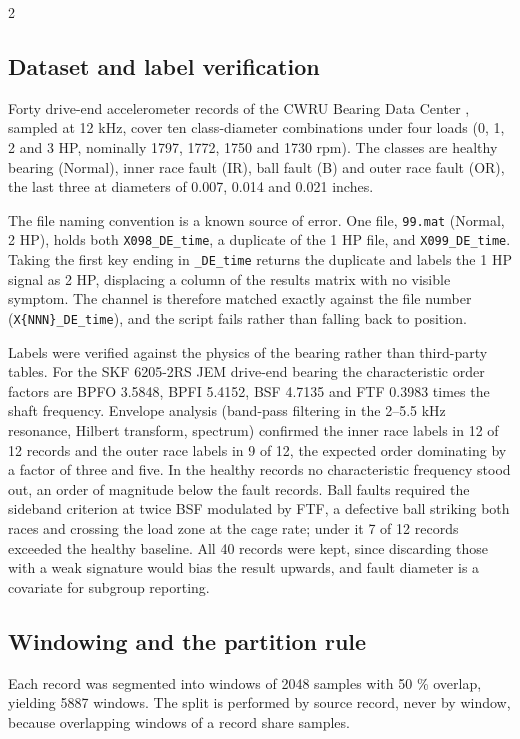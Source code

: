 \documentclass[12pt,twoside,titlepage]{ingenius}
\begin{document}
\begin{multicols}{2}
\subsection{Dataset and label verification}

Forty drive-end accelerometer records of the CWRU Bearing Data Center
\cite{cwru}, sampled at 12 kHz, cover ten class-diameter combinations under four
loads (0, 1, 2 and 3 HP, nominally 1797, 1772, 1750 and 1730 rpm). The classes
are healthy bearing (Normal), inner race fault (IR), ball fault (B) and outer
race fault (OR), the last three at diameters of 0.007, 0.014 and 0.021 inches.

The file naming convention is a known source of error. One file,
\texttt{99.mat} (Normal, 2 HP), holds both \texttt{X098\_DE\_time}, a duplicate of
the 1 HP file, and \texttt{X099\_DE\_time}. Taking the first key ending in
\texttt{\_DE\_time} returns the duplicate and labels the 1 HP signal as 2 HP,
displacing a column of the results matrix with no visible symptom. The channel
is therefore matched exactly against the file number
(\texttt{X\{NNN\}\_DE\_time}), and the script fails rather than falling back to
position.

Labels were verified against the physics of the bearing rather than third-party
tables. For the SKF 6205-2RS JEM drive-end bearing the characteristic order
factors are BPFO 3.5848, BPFI 5.4152, BSF 4.7135 and FTF 0.3983 times the shaft
frequency. Envelope analysis (band-pass filtering in the 2--5.5 kHz resonance,
Hilbert transform, spectrum) confirmed the inner race labels in 12 of 12 records
and the outer race labels in 9 of 12, the expected order dominating by a factor
of three and five. In the healthy records no characteristic frequency stood out,
an order of magnitude below the fault records. Ball faults required the sideband
criterion at twice BSF modulated by FTF, a defective ball striking both races
and crossing the load zone at the cage rate; under it 7 of 12 records exceeded
the healthy baseline. All 40 records were kept, since discarding those with a
weak signature would bias the result upwards, and fault diameter is a covariate
for subgroup reporting.

\subsection{Windowing and the partition rule}

Each record was segmented into windows of 2048 samples with 50 \% overlap,
yielding 5887 windows. The split is performed by source record, never by window,
because overlapping windows of a record share samples.


\end{multicols}
\end{document}
